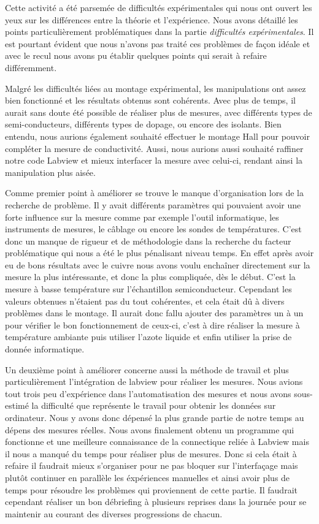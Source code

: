 Cette activité a été parsemée de difficultés expérimentales qui nous ont ouvert les yeux sur les différences entre la théorie et l'expérience. Nous avons détaillé les points particulièrement problématiques dans la partie \emph{difficultés expérimentales}. Il est pourtant évident que nous n'avons pas traité ces problèmes de façon idéale et avec le recul nous avons pu établir quelques points qui serait à refaire différemment.

Malgré les difficultés liées au montage expérimental, les manipulations ont assez bien fonctionné et les résultats obtenus sont cohérents.
Avec plus de temps, il aurait sans doute été possible de réaliser plus de mesures, avec différents types de semi-conducteurs, différents types de dopage, ou encore des isolants.
Bien entendu, nous aurions également souhaité effectuer le montage Hall pour pouvoir compléter la mesure de conductivité.
Aussi, nous aurions aussi souhaité raffiner notre code Labview et mieux interfacer la mesure avec celui-ci, rendant ainsi la manipulation plus aisée.

Comme premier point à améliorer se trouve le manque d'organisation lors de la recherche de problème. Il y avait différents paramètres qui pouvaient avoir une forte influence sur la mesure comme par exemple l'outil informatique, les instruments de mesures, le câblage ou encore les sondes de températures. C'est donc un manque de rigueur et de méthodologie dans la recherche du facteur problématique qui nous a été le plus pénalisant niveau temps. En effet après avoir eu de bons résultats avec le cuivre nous avons voulu enchaîner directement sur la mesure la plus intéressante, et donc la plus compliquée, dès le début. C'est la mesure à basse température sur l'échantillon semiconducteur. Cependant les valeurs obtenues n'étaient pas du tout cohérentes, et cela était dû à divers problèmes dans le montage. Il aurait donc fallu ajouter des paramètres un à un pour vérifier le bon fonctionnement de ceux-ci, c'est à dire réaliser la mesure à température ambiante puis utiliser l'azote liquide et enfin utiliser la prise de donnée informatique. 

Un deuxième point à améliorer concerne aussi la méthode de travail et plus particulièrement l'intégration de labview pour réaliser les mesures. Nous avions tout trois peu d'expérience dans l'automatisation des mesures et nous avons sous-estimé la difficulté que représente le travail pour obtenir les données sur ordinateur. Nous y avons donc dépensé la plus grande partie de notre temps au dépens des mesures réelles. Nous avons finalement obtenu un programme qui fonctionne et une meilleure connaissance de la connectique reliée à Labview mais il nous a manqué du temps pour réaliser plus de mesures. Donc si cela était à refaire il faudrait mieux s'organiser pour ne pas bloquer sur l'interfaçage mais plutôt continuer en parallèle les éxpériences manuelles et ainsi avoir plus de temps pour résoudre les problèmes qui proviennent de cette partie. Il faudrait cependant réaliser un bon débriefing à plusieurs reprises dans la journée pour se maintenir au courant des diverses progressions de chacun. 

